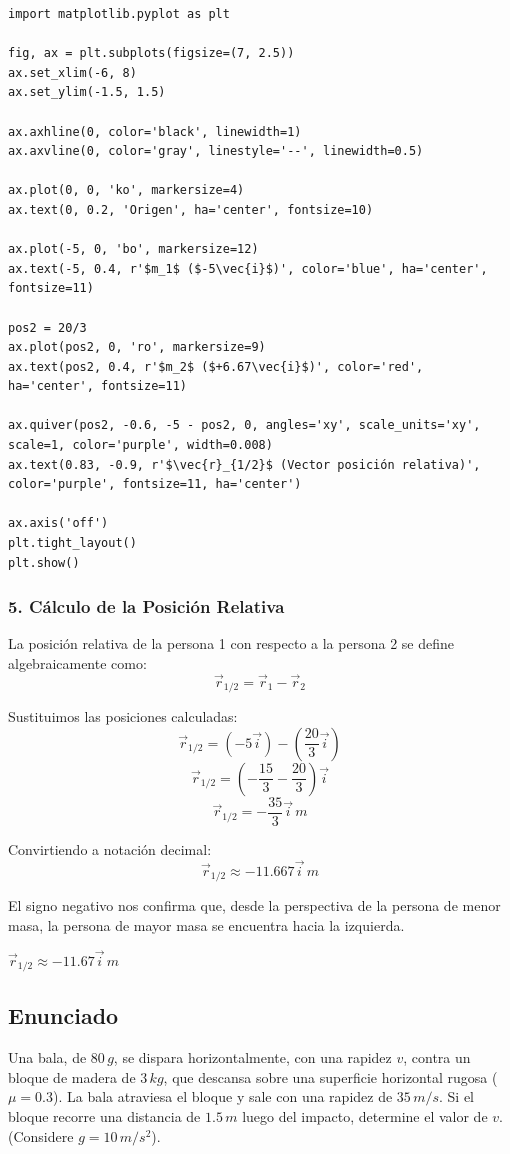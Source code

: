 \documentclass[12pt, a4paper]{article}
\begin{document}
\begin{lstlisting}
import matplotlib.pyplot as plt

fig, ax = plt.subplots(figsize=(7, 2.5))
ax.set_xlim(-6, 8)
ax.set_ylim(-1.5, 1.5)

ax.axhline(0, color='black', linewidth=1)
ax.axvline(0, color='gray', linestyle='--', linewidth=0.5)

ax.plot(0, 0, 'ko', markersize=4)
ax.text(0, 0.2, 'Origen', ha='center', fontsize=10)

ax.plot(-5, 0, 'bo', markersize=12)
ax.text(-5, 0.4, r'$m_1$ ($-5\vec{i}$)', color='blue', ha='center', fontsize=11)

pos2 = 20/3
ax.plot(pos2, 0, 'ro', markersize=9)
ax.text(pos2, 0.4, r'$m_2$ ($+6.67\vec{i}$)', color='red', ha='center', fontsize=11)

ax.quiver(pos2, -0.6, -5 - pos2, 0, angles='xy', scale_units='xy', scale=1, color='purple', width=0.008)
ax.text(0.83, -0.9, r'$\vec{r}_{1/2}$ (Vector posición relativa)', color='purple', fontsize=11, ha='center')

ax.axis('off')
plt.tight_layout()
plt.show()
\end{lstlisting}

\subsubsection*{5. Cálculo de la Posición Relativa}
La posición relativa de la persona 1 con respecto a la persona 2 se define algebraicamente como:
\[ \vec{r}_{1/2} = \vec{r}_1 - \vec{r}_2 \]

Sustituimos las posiciones calculadas:
\[ \vec{r}_{1/2} = (-5 \vec{i}) - \left(\frac{20}{3} \vec{i}\right) \]
\[ \vec{r}_{1/2} = \left(-\frac{15}{3} - \frac{20}{3}\right) \vec{i} \]
\[ \vec{r}_{1/2} = -\frac{35}{3} \vec{i} \, \si{m} \]

Convirtiendo a notación decimal:
\[ \vec{r}_{1/2} \approx -11.667 \vec{i} \, \si{m} \]

El signo negativo nos confirma que, desde la perspectiva de la persona de menor masa, la persona de mayor masa se encuentra hacia la izquierda.

\begin{tcolorbox}[colback=green!5!white, colframe=green!50!black, title=Respuesta Final]
\centering \Large $\vec{r}_{1/2} \approx -11.67 \vec{i} \, \si{m}$
\end{tcolorbox}

\newpage

\subsection*{Enunciado}
Una bala, de $80 \, \si{g}$, se dispara horizontalmente, con una rapidez $v$, contra un bloque de madera de $3 \, \si{kg}$, que descansa sobre una superficie horizontal rugosa ($\mu = 0.3$). La bala atraviesa el bloque y sale con una rapidez de $35 \, \si{m/s}$. Si el bloque recorre una distancia de $1.5 \, \si{m}$ luego del impacto, determine el valor de $v$. (Considere $g = 10 \, \si{m/s^2}$).
\end{document}

